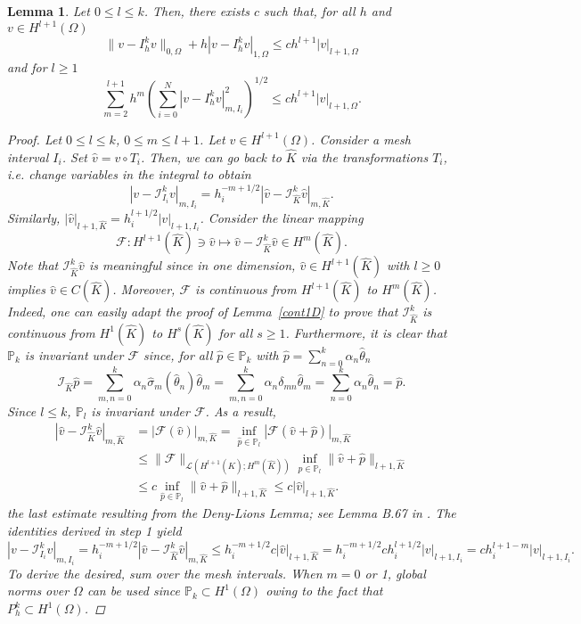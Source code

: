 \documentclass{article}
\newtheorem{lemma}{Lemma}
\begin{document}
\begin{lemma}\label{interpolationerrPk}
    Let $0 \le l \le k$. Then, there exists $c$ such that, for all $h$ and $v \in H^{l+1}(\Omega)$
    $$ \|v - I_h^k v\|_{0,\Omega} + h |v - I_h^k v|_{1,\Omega} \le c h^{l+1} |v|_{l+1,\Omega} $$
    and for $l \ge 1$
    $$ \sum_{m=2}^{l+1} h^m \left(\sum_{i=0}^N |v - I_h^k v|_{m,I_i}^2\right)^{1/2} \le c h^{l+1} |v|_{l+1,\Omega}. $$

\begin{proof}
    Let $0 \le l \le k$, $0 \le m \le l+1$. Let $v \in H^{l+1}(\Omega)$.
    Consider a mesh interval $I_i$. Set $\hat{v} = v \circ T_i$. Then, we can go back to $\hat{K}$ via the transformations $T_i$, i.e. change variables in the integral to obtain
    $$ |v - \mathcal{I}_{I_i}^k v|_{m,I_i} = h_i^{-m+1/2} |\hat{v} - \mathcal{I}_{\hat{K}}^k \hat{v}|_{m,\hat{K}}. $$
    Similarly, $|\hat{v}|_{l+1,\hat{K}} = h_i^{l+1/2} |v|_{l+1,I_i}$. 
    Consider the linear mapping
    $$ \mathcal{F}: H^{l+1}(\hat{K}) \ni \hat{v} \mapsto \hat{v} - \mathcal{I}_{\hat{K}}^k \hat{v} \in H^m(\hat{K}). $$
    Note that $\mathcal{I}_{\hat{K}}^k \hat{v}$ is meaningful since in one dimension, $\hat{v} \in H^{l+1}(\hat{K})$ with $l \ge 0$ implies $\hat{v} \in C(\hat{K})$. Moreover, $\mathcal{F}$ is continuous from $H^{l+1}(\hat{K})$ to $H^m(\hat{K})$. Indeed, one can easily adapt the proof of Lemma~\ref{cont1D} to prove that $\mathcal{I}_{\hat{K}}^k$ is continuous from $H^1(\hat{K})$ to $H^s(\hat{K})$ for all $s \ge 1$. Furthermore, it is clear that $\mathbb{P}_k$ is invariant under $\mathcal{F}$ since, for all $\hat{p} \in \mathbb{P}_k$ with $\hat{p} = \sum_{n=0}^k \alpha_n \hat{\theta}_n$
    $$ \mathcal{I}_{\hat{K}} \hat{p} = \sum_{m,n=0}^k \alpha_n \hat{\sigma}_m(\hat{\theta}_n) \hat{\theta}_m = \sum_{m,n=0}^k \alpha_n \delta_{mn} \hat{\theta}_m = \sum_{n=0}^k \alpha_n \hat{\theta}_n = \hat{p}. $$
    Since $l \le k$, $\mathbb{P}_l$ is invariant under $\mathcal{F}$. As a result,
    \begin{align*}
        |\hat{v} - \mathcal{I}_{\hat{K}}^k \hat{v}|_{m,\hat{K}} &= |\mathcal{F}(\hat{v})|_{m,\hat{K}} = \inf_{\hat{p} \in \mathbb{P}_l} |\mathcal{F}(\hat{v} + \hat{p})|_{m,\hat{K}} \\
        &\le \|\mathcal{F}\|_{\mathcal{L}(H^{l+1}(\hat{K});H^m(\hat{K}))} \inf_{\hat{p} \in \mathbb{P}_l} \|\hat{v} + \hat{p}\|_{l+1,\hat{K}} \\
        &\le c \inf_{\hat{p} \in \mathbb{P}_l} \|\hat{v} + \hat{p}\|_{l+1,\hat{K}} \le c |\hat{v}|_{l+1,\hat{K}}.
    \end{align*}
    the last estimate resulting from the Deny-Lions Lemma; see Lemma B.67 in \cite{ern2004theory}. The identities derived in step 1 yield
    $$ |v - \mathcal{I}_{I_i}^k v|_{m,I_i} = h_i^{-m+1/2} |\hat{v} - \mathcal{I}_{\hat{K}}^k \hat{v}|_{m,\hat{K}} \le h_i^{-m+1/2} c |\hat{v}|_{l+1,\hat{K}} = h_i^{-m+1/2} c h_i^{l+1/2} |v|_{l+1,I_i} = c h_i^{l+1-m} |v|_{l+1,I_i}. $$
    To derive the desired, sum over the mesh intervals. When $m = 0$ or 1, global norms over $\Omega$ can be used since $\mathbb{P}_k \subset H^1(\Omega)$ owing to the fact that $P_h^k\subset H^1(\Omega)$.
\end{proof}
\end{lemma}
\end{document}
